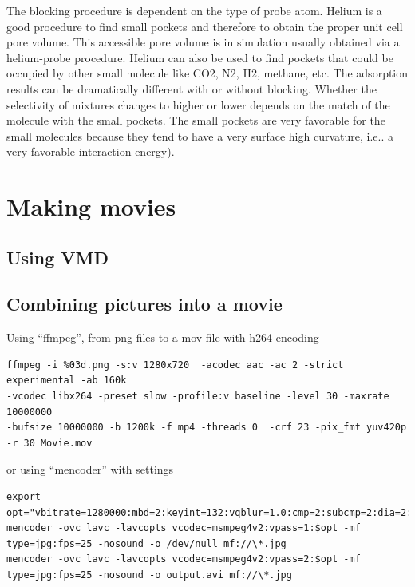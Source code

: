 The blocking procedure is dependent on the type of probe atom. Helium is a good procedure to find small pockets 
and therefore to obtain the proper unit cell pore volume. This accessible pore volume is in simulation 
usually obtained via a helium-probe procedure. Helium can also be used to find pockets that 
could be occupied by other small molecule like CO2, N2, H2, methane, etc.
The adsorption results can be dramatically different with or without blocking. Whether the selectivity of 
mixtures changes to higher or lower depends on the match of the molecule with the small pockets. 
The small pockets are very favorable for the small molecules because they tend to have a very surface high 
curvature, i.e.. a very favorable interaction energy). 

\section{Making movies}

\subsection{Using VMD}

\subsection{Combining pictures into a movie}

Using ``ffmpeg'', from png-files to a mov-file with h264-encoding
\begin{verbatim}
ffmpeg -i %03d.png -s:v 1280x720  -acodec aac -ac 2 -strict experimental -ab 160k 
-vcodec libx264 -preset slow -profile:v baseline -level 30 -maxrate 10000000 
-bufsize 10000000 -b 1200k -f mp4 -threads 0  -crf 23 -pix_fmt yuv420p -r 30 Movie.mov 
\end{verbatim}
or using ``mencoder'' with settings 
\begin{footnotesize}
\begin{verbatim}
export opt="vbitrate=1280000:mbd=2:keyint=132:vqblur=1.0:cmp=2:subcmp=2:dia=2:mv0:last_pred=3"
mencoder -ovc lavc -lavcopts vcodec=msmpeg4v2:vpass=1:$opt -mf type=jpg:fps=25 -nosound -o /dev/null mf://\*.jpg
mencoder -ovc lavc -lavcopts vcodec=msmpeg4v2:vpass=2:$opt -mf type=jpg:fps=25 -nosound -o output.avi mf://\*.jpg
\end{verbatim}
\end{footnotesize}

